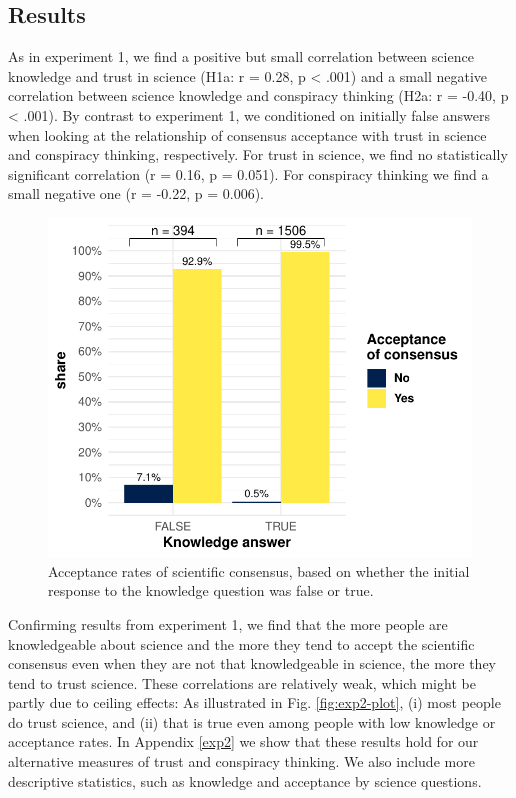 \documentclass[
  doc,floatsintext]{apa6}
\begin{document}
\subsection{Results}\label{results-1}

As in experiment 1, we find a positive but small correlation between science knowledge and trust in science (H1a: r = 0.28, p \textless{} .001) and a small negative correlation between science knowledge and conspiracy thinking (H2a: r = -0.40, p \textless{} .001). By contrast to experiment 1, we conditioned on initially false answers when looking at the relationship of consensus acceptance with trust in science and conspiracy thinking, respectively. For trust in science, we find no statistically significant correlation (r = 0.16, p = 0.051). For conspiracy thinking we find a small negative one (r = -0.22, p = 0.006).



\begin{figure}
\centering
\includegraphics{output/figures/exp2-conditional-acceptance.pdf}
\caption{\label{fig:exp2-conditional-acceptance}Acceptance rates of scientific consensus, based on whether the initial response to the knowledge question was false or true.}
\end{figure}

Confirming results from experiment 1, we find that the more people are knowledgeable about science and the more they tend to accept the scientific consensus even when they are not that knowledgeable in science, the more they tend to trust science. These correlations are relatively weak, which might be partly due to ceiling effects: As illustrated in Fig. \ref{fig:exp2-plot}, (i) most people do trust science, and (ii) that is true even among people with low knowledge or acceptance rates. In Appendix \ref{exp2} we show that these results hold for our alternative measures of trust and conspiracy thinking. We also include more descriptive statistics, such as knowledge and acceptance by science questions.
\end{document}
